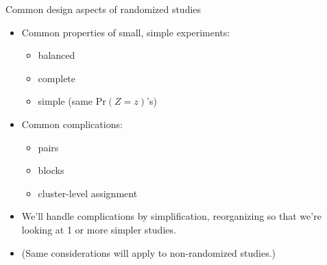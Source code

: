 \begin{frame}{Common design aspects of randomized studies}
  \begin{itemize}
  \item<1-> Common properties of small, simple experiments:
    \begin{itemize}
    \item balanced 
    \item complete
    \item simple (same $\mathrm{Pr}(Z=z)$'s)
    \end{itemize}
  \item<2-> Common complications:
    \begin{itemize}
    \item<2-> pairs
    \item<2-> blocks
    \item<2-> cluster-level assignment
    \end{itemize}
  \item<3-> We'll handle complications by simplification, reorganizing so that we're looking at 1 or more simpler studies.
  \item<4-> (Same considerations will apply to non-randomized studies.)
  \end{itemize}

\end{frame}


